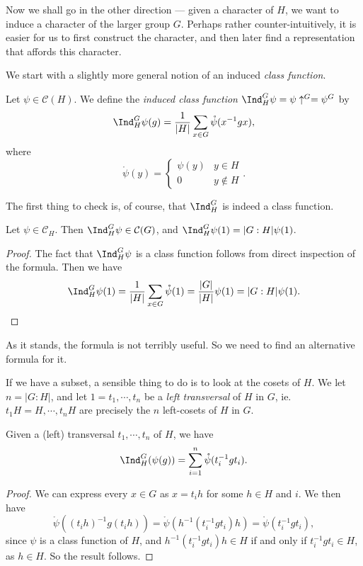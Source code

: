\documentclass[a4paper]{article}
\begin{document}
Now we shall go in the other direction --- given a character of $H$, we want to induce a character of the larger group $G$. Perhaps rather counter-intuitively, it is easier for us to first construct the character, and then later find a representation that affords this character.

We start with a slightly more general notion of an induced \emph{class function}.
\begin{defi}
  Let $\psi \in \mathcal{C}(H)$. We define the \emph{induced class function} $\Ind^G_H \psi = \psi\uparrow^G = \psi^G$ by
  \[
    \Ind_H^G \psi(g) = \frac{1}{|H|} \sum_{x \in G} \mathring{\psi} (x^{-1}gx),
  \]
  where
  \[
    \mathring{\psi}(y) =
    \begin{cases}
      \psi(y) & y \in H\\
      0 & y \not\in H
    \end{cases}.
  \]
\end{defi}
The first thing to check is, of course, that $\Ind^G_H$ is indeed a class function.

\begin{lemma}
  Let $\psi \in \mathcal{C}_H$. Then $\Ind_H^G \psi \in \mathcal{C}(G)$, and $\Ind_H^G\psi(1) = |G:H| \psi(1)$.
\end{lemma}

\begin{proof}
  The fact that $\Ind_H^G\psi$ is a class function follows from direct inspection of the formula. Then we have
  \[
    \Ind_H^G \psi(1) = \frac{1}{|H|} \sum_{x \in G} \mathring{\psi}(1) = \frac{|G|}{|H|}\psi(1) = |G:H|\psi(1).
  \]
\end{proof}
As it stands, the formula is not terribly useful. So we need to find an alternative formula for it.

If we have a subset, a sensible thing to do is to look at the cosets of $H$. We let $n = |G:H|$, and let $1 = t_1, \cdots, t_n$ be a \emph{left transversal} of $H$ in $G$, ie. $t_1 H = H, \cdots, t_n H$ are precisely the $n$ left-cosets of $H$ in $G$.

\begin{lemma}
  Given a (left) transversal $t_1, \cdots, t_n$ of $H$, we have
  \[
    \Ind_H^G(\psi(g)) = \sum_{i = 1}^n \mathring{\psi}(t_i^{-1} g t_i).
  \]
\end{lemma}

\begin{proof}
  We can express every $x \in G$ as $x = t_i h$ for some $h \in H$ and $i$. We then have
  \[
    \mathring{\psi}((t_i h)^{-1} g(t_i h)) = \mathring{\psi}(h^{-1} (t_i^{-1} g t_i) h) = \mathring{\psi}(t_i^{-1} gt_i),
  \]
  since $\psi$ is a class function of $H$, and $h^{-1} (t_i^{-1} g t_i) h \in H$ if and only if $t_i^{-1} g t_i \in H$, as $h \in H$. So the result follows.
\end{proof}
\end{document}
